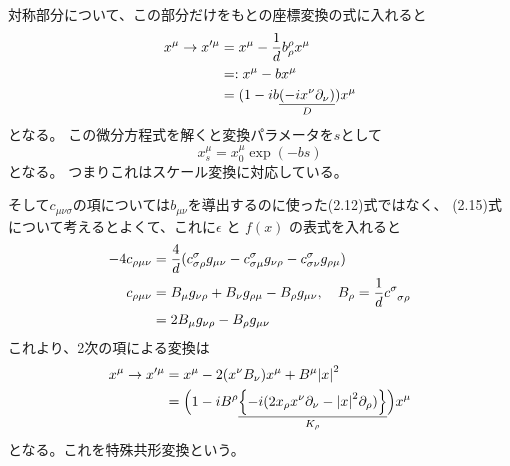 \documentclass[../../master.tex]{subfiles}
\begin{document}
対称部分について、この部分だけをもとの座標変換の式に入れると
\begin{align}
    x^\mu\rightarrow x'^\mu
    &= x^\mu - \frac{1}{d}b_{\rho}^{\rho} x^\mu\notag\\
    &=: x^\mu - b x^\mu\\
    &= (1 -ib\underset{D}{\underline{(-ix^\nu\partial_\nu)}})x^\mu \notag
\end{align}
となる。
この微分方程式を解くと変換パラメータを\(s\)として
\begin{equation*}
    x_s^\mu = x_0^\mu \exp(-bs)
\end{equation*}
となる。
つまりこれはスケール変換に対応している。

そして\(c_{\mu\nu\sigma}\)の項については\(b_{\mu\nu}\)を導出するのに使った(2.12)式ではなく、
(2.15)式について考えるとよくて、これに\(\epsilon\) と \(f(x)\) の表式を入れると
\begin{align}
    -4c_{\rho\mu\nu}
    &= \frac{4}{d}(c_{\sigma\rho}^\sigma g_{\mu\nu}-c_{\sigma\mu}^\sigma g_{\nu\rho}-c_{\sigma\nu}^\sigma g_{\rho\mu}) \notag\\
    c_{\rho\mu\nu} &= B_\mu g_{\nu\rho} + B_\nu g_{\rho\mu} - B_\rho g_{\mu\nu},\quad B_\rho = \frac{1}{d}c\indices{^\sigma_{\sigma\rho}}\\
    &= 2 B_\mu g_{\nu\rho} - B_\rho g_{\mu\nu}\notag
\end{align}
これより、2次の項による変換は
\begin{align}
    x^\mu\rightarrow x'^\mu
    &= x^\mu - 2(x^\nu B_\nu)x^\mu + B^\mu \abs{x}^2\\
    &= \Bigl(1 -iB^\rho\underset{K_\rho}{\underline{\Bigl\{-i(2x_\rho x^\nu\partial_\nu - \abs{x}^2\partial_\rho)\Bigr\}}}\Bigr)x^\mu \notag
\end{align}
となる。これを特殊共形変換という。
\end{document}
